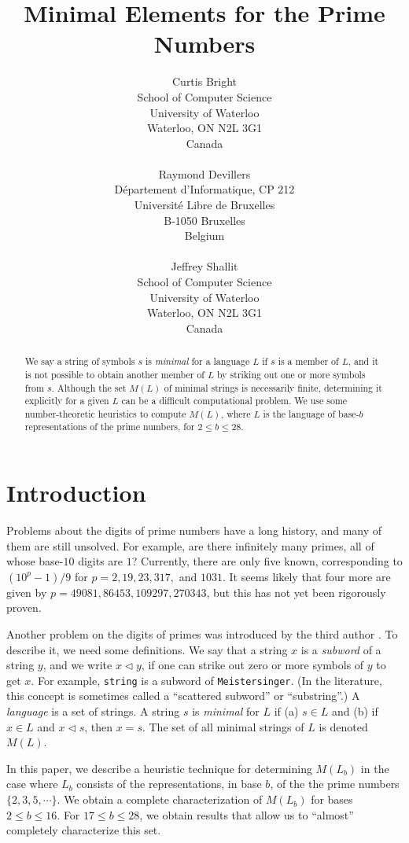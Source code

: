 \documentclass[12pt]{article}
\title{Minimal Elements for the Prime Numbers}
\author{Curtis Bright\\
School of Computer Science\\
University of Waterloo\\
Waterloo, ON  N2L 3G1\\
Canada\\
\ \\
Raymond Devillers\\
D\'epartement d'Informatique, CP 212\\
Universit\'e Libre de Bruxelles \\
B-1050 Bruxelles\\
Belgium\\
\ \\
Jeffrey Shallit \\
School of Computer Science\\
University of Waterloo\\
Waterloo, ON  N2L 3G1\\
Canada}
\def\subw{\triangleleft}
\theoremstyle{plain}
\theoremstyle{definition}
\theoremstyle{remark}
\newcommand{\0}{\mathtt{0}}
\newcommand{\1}{\mathtt{1}}
\newcommand{\2}{\mathtt{2}}
\newcommand{\3}{\mathtt{3}}
\newcommand{\4}{\mathtt{4}}
\newcommand{\5}{\mathtt{5}}
\newcommand{\6}{\mathtt{6}}
\newcommand{\7}{\mathtt{7}}
\newcommand{\8}{\mathtt{8}}
\newcommand{\9}{\mathtt{9}}
\begin{document}
\maketitle

\begin{abstract}
We say a string of symbols $s$ is {\it minimal} for a language $L$
if $s$ is a member of $L$, and it is not possible to obtain another 
member of $L$ by striking out one or more symbols from $s$.  Although
the set $M(L)$ of minimal strings is necessarily finite, determining
it explicitly for a given $L$ can be a difficult computational problem.  
We use some number-theoretic heuristics to compute $M(L)$, where $L$
is the language of base-$b$ representations of the prime numbers,
for $2 \leq b \leq 28$.
\end{abstract}

\section{Introduction}

Problems about the digits of prime numbers have a long history, and many
of them are still unsolved.  For example, are there infinitely many
primes, all of whose base-$10$ digits are $1$?  Currently,
there are only five
known, corresponding to $(10^p-1)/9$ for $p = 2, 19, 23, 317, $ and
$1031$.    It seems likely that four more are given by
$p = 49081, 86453, 109297, 270343$, but this has not yet been
rigorously proven.

Another problem on the digits of primes was introduced by the
third author \cite{Sh00}.  To describe it, we need some definitions.
We say that a string $x$ is a {\it subword} of a string $y$, and 
we write $x \subw y$, if 
one can strike out zero or more symbols of $y$ to get $x$.
For example, {\tt string} is a subword of
{\tt Meistersinger}.  
(In the literature, this concept is sometimes called a ``scattered
subword'' or ``substring''.)
A {\it language} is a set of strings.  A string $s$ is {\it minimal}
for $L$ if  (a) $s \in L$ and (b) if $x \in L$ and $x \subw s$, then
$x = s$.    The set of all minimal strings of $L$ is denoted $M(L)$.

In this paper, we describe a heuristic
technique for determining $M(L_b)$ in the
case where $L_b$ consists of the representations, in base $b$, of the
the prime numbers $\lbrace 2, 3, 5, \cdots \rbrace$.  We obtain
a complete characterization of $M(L_b)$ for bases
$2 \leq b \leq 16$.   For $17 \leq b \leq 28$, we obtain
results that allow us to ``almost'' completely characterize this set.
\end{document}
